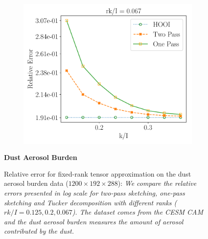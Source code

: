 \begin{figure}
\begin{subfigure}{0.32\textwidth}
    \includegraphics[scale = 0.3]{figure/BURDENDUST_frk15.pdf}
    \end{subfigure}
    \textbf{Dust Aerosol Burden}
    \caption{Relative error for fixed-rank tensor approximation on the dust aerosol burden data ($1200 \times 192 \times 288$): \textit{We compare the relative errors presented in log scale for two-pass sketching, one-pass sketching and Tucker decomposition with different ranks ($rk/I = 0.125,0.2,0.067$). The dataset comes from the CESM CAM and the dust aerosol burden measures the amount of aerosol contributed by the dust.}} \label{fig:burden_dust}
\end{figure}